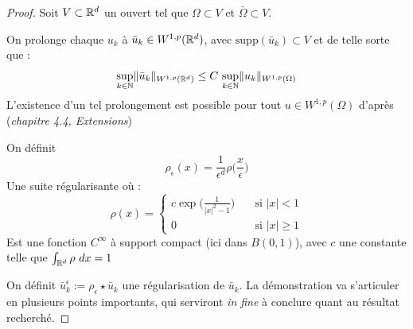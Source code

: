 \begin{proof}
    Soit $V \subset \mathbb{R}^d$ un ouvert tel que $\Omega \subset V$ et $\bar{\Omega} \subset V$.

    On prolonge chaque $u_k$ à $\bar{u}_k \in W^{1,p}(\mathbb{R}^d)$, avec $\text{supp}(\bar{u}_k) \subset V$ et de telle sorte que :
    $$\underset{k \in \mathbb{N}}{\sup} \|\bar{u}_k\|_{W^{1,p}(\mathbb{R}^d)} \leq C \ \underset{k \in \mathbb{N}}{\sup}\|u_k\|_{W^{1,p}(\Omega)}$$
    L'existence d'un tel prolongement est possible pour tout $u \in W^{1,p}(\Omega)$ d'après \cite{Evans} (\textit{chapitre 4.4, Extensions})

    On définit 
    $$\rho_{\epsilon}(x) = \frac{1}{\epsilon^d} \rho\Big(\frac{x}{\epsilon}\Big) $$ 
    Une suite régularisante où :
    $$\rho(x) = 
    \begin{cases}
        c \exp \Big(\frac{1}{|x|^2 - 1}\Big) \quad &\text{si } |x| < 1 \\
        0 &\text{si } |x| \geq 1
    \end{cases}$$
    Est une fonction $C^{\infty}$ à support compact (ici dans $B(0,1)$), avec $c$ une constante telle que $\int_{\mathbb{R}^d} \rho \ dx = 1$

    On définit $\bar{u}_k^{\epsilon} := \rho_{\epsilon} \star \bar{u}_k $ une régularisation de $\bar{u}_k$. La démonstration va s'articuler en 
    plusieurs points importants, qui serviront \textit{in fine} à conclure quant au résultat recherché.


\end{proof}
